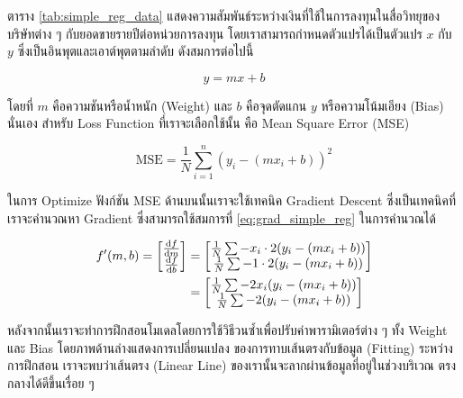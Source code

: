 ตาราง \ref{tab:simple_reg_data} แสดงความสัมพันธ์ระหว่างเงินที่ใช้ในการลงทุนในสื่อวิทยุของบริษัทต่าง ๆ กับยอดขายรายปีต่อหน่วยการลงทุน 
โดยเราสามารถกำหนดตัวแปรได้เป็นตัวแปร $x$ กับ $y$ ซึ่งเป็นอินพุตและเอาต์พุตตามลำดับ ดังสมการต่อไปนี้

\begin{equation}
    y = mx + b
\end{equation}

\noindent โดยที่ $m$ คือความชันหรือน้ำหนัก (Weight) และ $b$ คือจุดตัดแกน $y$ หรือความโน้มเอียง (Bias) นั่นเอง สำหรับ Loss 
Function ที่เราจะเลือกใช้นั้น คือ Mean Square Error (MSE)

\begin{equation}
    \text{MSE} = \frac{1}{N} \sum_{i=1}^{n} (y_i - (m x_i + b))^2
\end{equation}

ในการ Optimize ฟังก์ชัน MSE ด้านบนนั้นเราจะใช้เทคนิค Gradient Descent ซึ่งเป็นเทคนิคที่เราจะคำนวณหา Gradient ซึ่งสามารถใช้สมการที่
\ref{eq:grad_simple_reg} ในการคำนวณได้

\begin{align}\label{eq:grad_simple_reg}
    f'(m,b) =
      \begin{bmatrix}
        \dv{f}{m}\\
        \dv{f}{b}\\
      \end{bmatrix}
    &=
      \begin{bmatrix}
        \frac{1}{N} \sum -x_i \cdot 2(y_i - (mx_i + b)) \\
        \frac{1}{N} \sum -1 \cdot 2(y_i - (mx_i + b)) \\
      \end{bmatrix}\\
    &=
      \begin{bmatrix}
         \frac{1}{N} \sum -2x_i(y_i - (mx_i + b)) \\
         \frac{1}{N} \sum -2(y_i - (mx_i + b)) \\
      \end{bmatrix}
\end{align}

หลังจากนั้นเราจะทำการฝึกสอนโมเดลโดยการใช้วิธีวนซ้ำเพื่อปรับค่าพารามิเตอร์ต่าง ๆ ทั้ง Weight และ Bias โดยภาพด้านล่างแสดงการเปลี่ยนแปลง%
ของการทาบเส้นตรงกับข้อมูล (Fitting) ระหว่างการฝึกสอน เราจะพบว่าเส้นตรง (Linear Line) ของเรานั้นจะลากผ่านข้อมูลที่อยู่ในช่วงบริเวณ%
ตรงกลางได้ดีขึ้นเรื่อย ๆ 

